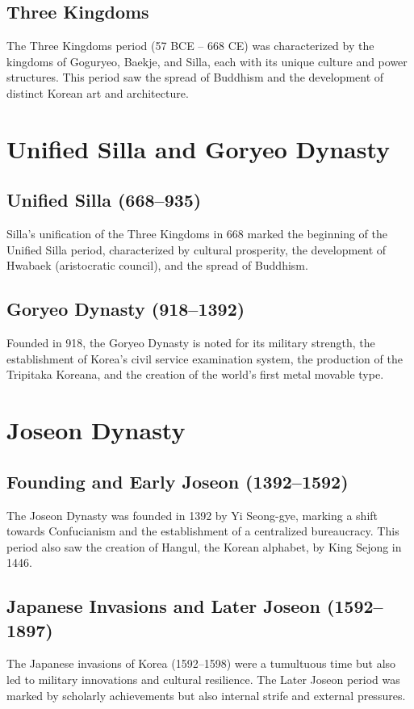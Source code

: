 \documentclass[a4paper,12pt]{book}
\begin{document}
\subsection{Three Kingdoms}
\label{subsec:three-kingdoms}
The Three Kingdoms period (57 BCE – 668 CE) was characterized by the kingdoms of Goguryeo, Baekje, and Silla, each with its unique culture and power structures. This period saw the spread of Buddhism and the development of distinct Korean art and architecture.

\section{Unified Silla and Goryeo Dynasty}
\label{sec:silla-goryeo}

\subsection{Unified Silla (668–935)}
\label{subsec:unified-silla}
Silla’s unification of the Three Kingdoms in 668 marked the beginning of the Unified Silla period, characterized by cultural prosperity, the development of Hwabaek (aristocratic council), and the spread of Buddhism.

\subsection{Goryeo Dynasty (918–1392)}
\label{subsec:goryeo-dynasty}
Founded in 918, the Goryeo Dynasty is noted for its military strength, the establishment of Korea’s civil service examination system, the production of the Tripitaka Koreana, and the creation of the world's first metal movable type.

\section{Joseon Dynasty}
\label{sec:joseon-dynasty}

\subsection{Founding and Early Joseon (1392–1592)}
\label{subsec:early-joseon}
The Joseon Dynasty was founded in 1392 by Yi Seong-gye, marking a shift towards Confucianism and the establishment of a centralized bureaucracy. This period also saw the creation of Hangul, the Korean alphabet, by King Sejong in 1446.

\subsection{Japanese Invasions and Later Joseon (1592–1897)}
\label{subsec:later-joseon}
The Japanese invasions of Korea (1592–1598) were a tumultuous time but also led to military innovations and cultural resilience. The Later Joseon period was marked by scholarly achievements but also internal strife and external pressures.
\end{document}

